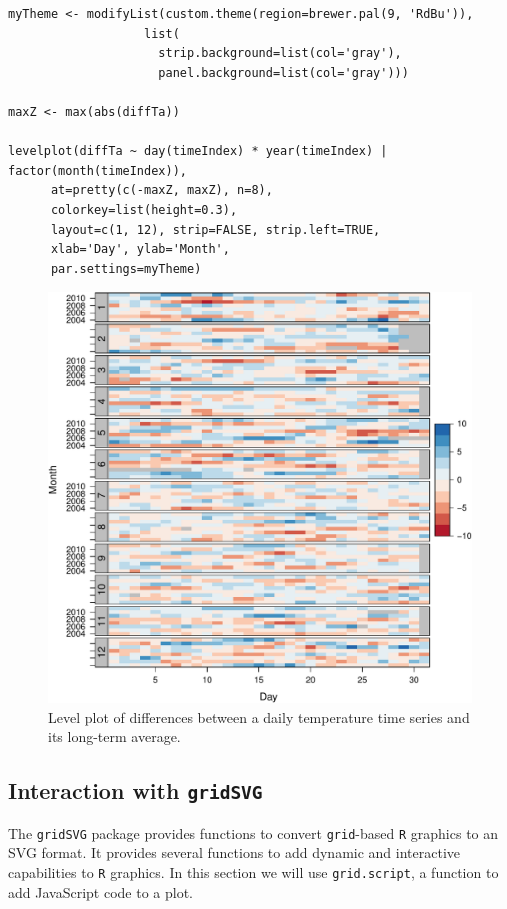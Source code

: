 \lstset{language=R,numbers=none}
\begin{lstlisting}
myTheme <- modifyList(custom.theme(region=brewer.pal(9, 'RdBu')),
				   list(
				     strip.background=list(col='gray'),
				     panel.background=list(col='gray')))

maxZ <- max(abs(diffTa))

levelplot(diffTa ~ day(timeIndex) * year(timeIndex) | factor(month(timeIndex)),
	  at=pretty(c(-maxZ, maxZ), n=8),
	  colorkey=list(height=0.3),
	  layout=c(1, 12), strip=FALSE, strip.left=TRUE,
	  xlab='Day', ylab='Month', 
	  par.settings=myTheme)
\end{lstlisting}

\begin{figure}[htb]
\centering
\includegraphics[width=.9\linewidth]{figs/diffTa_levelplot.pdf}
\caption{\label{fig:diffTa_level}Level plot of differences between a daily temperature time series and its long-term average.}
\end{figure}

\subsection{\floweroneleft Interaction with \texttt{gridSVG}}
\label{sec-2-4}
The \texttt{gridSVG} package provides functions to convert \texttt{grid}-based \texttt{R}
graphics to an SVG format. It provides several functions to add
dynamic and interactive capabilities to \texttt{R} graphics. In this section
we will use \texttt{grid.script}, a function to add JavaScript code to a
plot.

